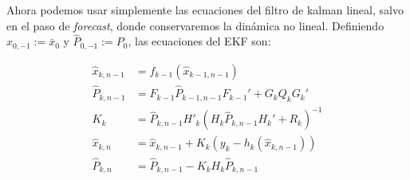 Ahora podemos usar simplemente las ecuaciones del filtro de kalman lineal, salvo en el paso de \textit{forecast}, donde conservaremos la dinámica no lineal. Definiendo \(\hat{x}_{0,-1}:= \bar{x}_0\) y \(\hat{P}_{0,-1}:= P_0\), las ecuaciones del EKF son:

\begin{equation}\label{eq:kalman-extended}
\begin{aligned}
\hat{x}_{k,n-1} &= f_{k-1}( \hat{x}_{k-1,n-1}) \\
\hat{P}_{k,n-1} &= F_{k-1} \hat{P}_{k-1,n-1} F_{k-1}' + G_k Q_k G_k'\\
K_k &= \hat{P}_{k,n-1} H'_{k}(H_{k}\hat{P}_{k,n-1}H_{k}' + R_k)^{-1}\\
\hat{x}_{k,n} &= \hat{x}_{k, n-1} + K_k(y_k-h_k(\hat{x}_{k,n-1})) \\
\hat{P}_{k,n} &= \hat{P}_{k,n-1}- K_k H_{k}\hat{P}_{k,n-1} \\
\end{aligned}
\end{equation}











